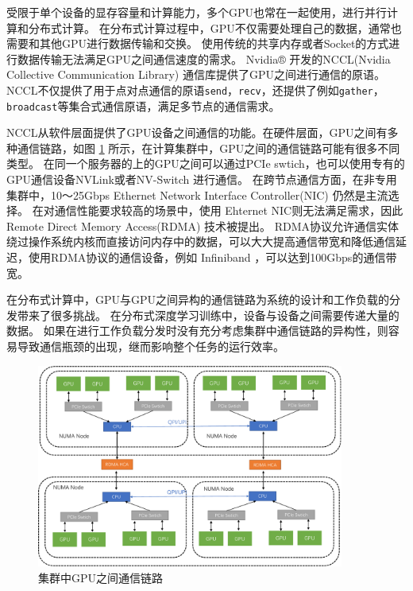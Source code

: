 受限于单个设备的显存容量和计算能力，多个GPU也常在一起使用，进行并行计算和分布式计算。
在分布式计算过程中，GPU不仅需要处理自己的数据，通常也需要和其他GPU进行数据传输和交换。
使用传统的共享内存或者Socket的方式进行数据传输无法满足GPU之间通信速度的需求。
Nvidia® 开发的NCCL(Nvidia Collective Communication Library) 通信库提供了GPU之间进行通信的原语。
NCCL不仅提供了用于点对点通信的原语\texttt{send}，\texttt{recv}，还提供了例如\texttt{gather}，\texttt{broadcast}等集合式通信原语，满足多节点的通信需求。

NCCL从软件层面提供了GPU设备之间通信的功能。在硬件层面，GPU之间有多种通信链路，如图 \ref{fig:gpu-commu} 所示，在计算集群中，GPU之间的通信链路可能有很多不同类型。
在同一个服务器的上的GPU之间可以通过PCIe swtich，也可以使用专有的GPU通信设备NVLink或者NV-Switch 进行通信。
在跨节点通信方面，在非专用集群中，10～25Gbps Ethernet Network Interface Controller(NIC) 仍然是主流选择。
在对通信性能要求较高的场景中，使用 Ehternet NIC则无法满足需求，因此Remote Direct Memory Access(RDMA)  技术被提出。
RDMA协议允许通信实体绕过操作系统内核而直接访问内存中的数据，可以大大提高通信带宽和降低通信延迟，使用RDMA协议的通信设备，例如 Infiniband ，可以达到100Gbps的通信带宽。

在分布式计算中，GPU与GPU之间异构的通信链路为系统的设计和工作负载的分发带来了很多挑战。
在分布式深度学习训练中，设备与设备之间需要传递大量的数据。
如果在进行工作负载分发时没有充分考虑集群中通信链路的异构性，则容易导致通信瓶颈的出现，继而影响整个任务的运行效率。
\begin{figure}[h]
	\centering
	\includegraphics[width=0.9\textwidth]{figure/2-background/commu.pdf}
	\caption{集群中GPU之间通信链路}
	\label{fig:gpu-commu}
\end{figure}

